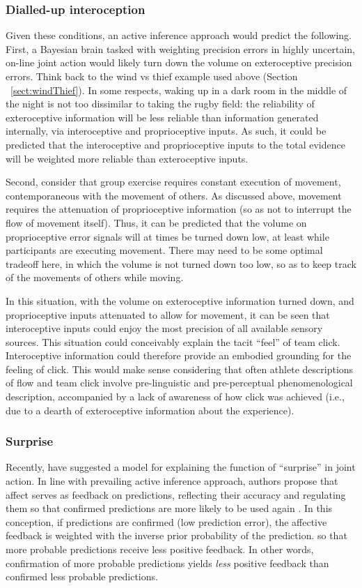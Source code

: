 \begin{CJK}{UTF8}{gbsn}
\subsubsection{Dialled-up interoception}
Given these conditions, an active inference approach would predict the following.  First, a Bayesian brain tasked with weighting precision errors in highly uncertain, on-line joint action would likely turn down the volume on exteroceptive precision errors.  Think back to the wind vs thief example used above (Section ~\ref{sect:windThief}). In some respects, waking up in a dark room in the middle of the night is not too dissimilar to taking the rugby field: the reliability of exteroceptive information will be less reliable than information generated internally, via interoceptive and proprioceptive inputs. As such, it could be predicted that the interoceptive and proprioceptive inputs to the total evidence will be weighted more reliable than exteroceptive inputs.

Second, consider that group exercise requires constant execution of movement, contemporaneous with the movement of others. As discussed above, movement requires the attenuation of proprioceptive information (so as not to interrupt the flow of movement itself).  Thus, it can be predicted that the volume on proprioceptive error signals will at times be turned down low, at least while participants are executing movement.  There may need to be some optimal tradeoff here, in which the volume is not turned down too low, so as to keep track of the movements of others while moving.

In this situation, with the volume on exteroceptive information turned down, and proprioceptive inputs attenuated to allow for movement, it can be seen that interoceptive inputs could enjoy the most precision of all available sensory sources. This situation could conceivably explain the tacit ``feel'' of team click.  Interoceptive information could therefore provide an embodied grounding for the feeling of click.  This would make sense considering that often athlete descriptions of flow and team click involve pre-linguistic and pre-perceptual phenomenological description, accompanied by a lack of awareness of how click was achieved (i.e., due to a dearth of exteroceptive information about the experience).

\subsubsection{Surprise}
Recently, \textcite{Chetverikov2016} have suggested a model for explaining the function of ``surprise'' in joint action.  In line with prevailing active inference approach, authors propose that affect serves as feedback on predictions, reflecting their accuracy and regulating them so that confirmed predictions are more likely to be used again \citep{Chetverikov2014}. In this conception, if predictions are confirmed (low prediction error), the affective feedback is weighted with the inverse prior probability of the prediction.
 so that more probable predictions receive less positive feedback. In other words, confirmation of more probable predictions yields \textit{less} positive feedback than confirmed less probable predictions.


\end{CJK}

